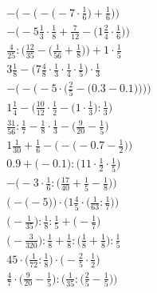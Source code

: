 \documentclass[8pt]{article}
\begin{document}
\begin{align}
-\bigg(-\Big(-\big(-7 \cdot \frac{1}{6}\big) + \frac{1}{6}\Big)\bigg) \\
-\Big(-5\frac{1}{3} \cdot \frac{1}{8} + \frac{7}{12} - \big(1\frac{2}{4} \cdot \frac{1}{6}\big)\Big) \\
\frac{4}{25} : \Big(\frac{12}{35} - \big(\frac{1}{56} + \frac{1}{8}\big)\Big) + 1 \cdot \frac{1}{5} \\
3\frac{1}{8} - \big(7\frac{4}{8} \cdot \frac{1}{3} \cdot \frac{1}{4} \cdot \frac{1}{5}\big) \cdot \frac{1}{3} \\
-\Bigg(-\bigg(-5 \cdot \Big(\frac{2}{5} - \big(0.3 - 0.1\big)\Big)\bigg)\Bigg) \\
1\frac{1}{4} - \Big(\frac{10}{12} \cdot \frac{1}{2} - \big(1 \cdot \frac{1}{3}\big) : \frac{1}{3}\Big) \\
\frac{31}{56} : \frac{1}{7} - \frac{1}{8} \cdot \frac{1}{3} - \big(\frac{9}{20} - \frac{1}{5}\big) \\
1\frac{1}{30} + \frac{1}{6} - \Big(-\big(-0.7 - \frac{1}{2}\big)\Big) \\
0.9 + \big(-0.1\big) : \big(11 \cdot \frac{1}{2} \cdot \frac{1}{5}\big) \\
-\Big(-3 \cdot \frac{1}{6} : \big(\frac{17}{40} + \frac{1}{5} - \frac{1}{8}\big)\Big) \\
\Big(-\big(-5\big)\Big) \cdot \Big(1\frac{4}{5} \cdot \big(\frac{1}{63} : \frac{1}{7}\big)\Big) \\
\big(-\frac{1}{35}\big) : \frac{1}{8} : \frac{1}{5} + \big(-\frac{1}{7}\big) \\
\big(-\frac{3}{320}\big) : \frac{1}{8} + \frac{1}{8} : \big(\frac{1}{8} + \frac{1}{8}\big) : \frac{1}{5} \\
45 \cdot \big(\frac{1}{72} : \frac{1}{8}\big) \cdot \big(-\frac{2}{5} \cdot \frac{1}{2}\big) \\
\frac{4}{7} \cdot \Big(\frac{9}{20} - \frac{1}{5}\Big) : \Big(\frac{1}{35} : \big(\frac{2}{5} - \frac{1}{5}\big)\Big)
\end{align}
\end{document}
